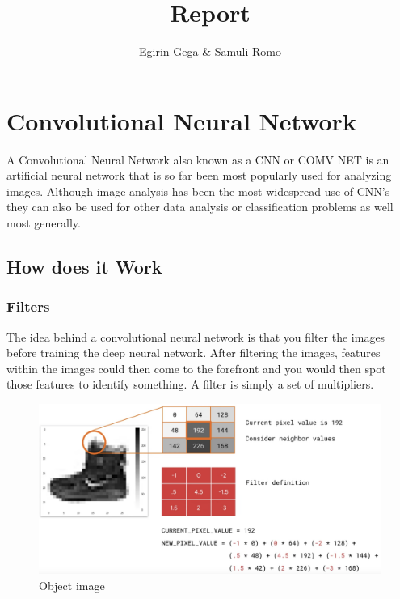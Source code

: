 \documentclass{article}
\title{Report}
\author{Egirin Gega \&  Samuli Romo}
\begin{document}
  \maketitle

  \newpage
  \tableofcontents
  \newpage
  \listoffigures
  \newpage
  \listoftables

  \newpage
  \section{Convolutional Neural Network}
  A Convolutional Neural Network also known as a CNN or COMV NET is an artificial neural network that is so far been most popularly used for analyzing images. Although image analysis has been the most widespread use of CNN's they can also be used for other data analysis or classification problems as well most generally.
  \subsection{How does it Work}
    \subsubsection{Filters}
    The idea behind a convolutional neural network is that you filter the images before training the deep neural network. After filtering the images, features within the images could then come to the forefront and you would then spot those features to identify something.
    A filter is simply a set of multipliers. 
    \vspace{20mm}
    \begin{figure}[h!]
      \begin{center}
        \includegraphics[width=\linewidth]{img/img2.png}
        \caption{Object image}
        \label{fig:snn}
      \end{center}
    \end{figure}
\end{document}
